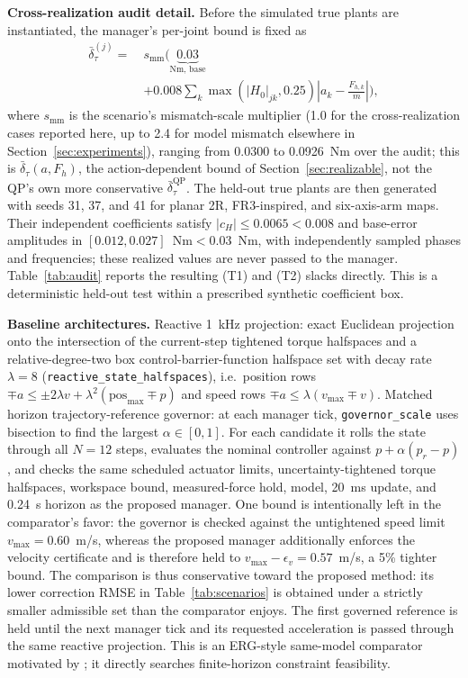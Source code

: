 \documentclass[journal]{IEEEtran}
\begin{document}
\textbf{Cross-realization audit detail.} Before the simulated true plants are instantiated, the manager's per-joint bound is fixed as
\begin{align*}
\bar\delta_\tau^{(j)}
=\ &s_{\mathrm{mm}}\Bigg(\underbrace{0.03}_{\text{Nm, base}} \\
&+0.008\sum_{k}\max\!\left(\left|H_0\right|_{jk},0.25\right)\left|a_k-\frac{F_{h,k}}{m}\right|\Bigg),
\end{align*}
where $s_{\mathrm{mm}}$ is the scenario's mismatch-scale multiplier (1.0 for the cross-realization cases reported here, up to 2.4 for model mismatch elsewhere in Section~\ref{sec:experiments}), ranging from 0.0300 to 0.0926~Nm over the audit; this is $\bar\delta_\tau(a,F_h)$, the action-dependent bound of Section~\ref{sec:realizable}, not the QP's own more conservative $\bar\delta_\tau^{\mathrm{QP}}$. The held-out true plants are then generated with seeds 31, 37, and 41 for planar 2R, FR3-inspired, and six-axis-arm maps. Their independent coefficients satisfy $|c_H|\le0.0065<0.008$ and base-error amplitudes in $[0.012,0.027]$~Nm${}<0.03$~Nm, with independently sampled phases and frequencies; these realized values are never passed to the manager. Table~\ref{tab:audit} reports the resulting (T1) and (T2) slacks directly. This is a deterministic held-out test within a prescribed synthetic coefficient box.

\textbf{Baseline architectures.} Reactive 1~kHz projection: exact Euclidean projection onto the intersection of the current-step tightened torque halfspaces and a relative-degree-two box control-barrier-function halfspace set with decay rate $\lambda=8$ (\texttt{reactive\_state\_halfspaces}), i.e.\ position rows $\mp a\le\pm2\lambda v+\lambda^2(\mathrm{pos}_{\max}\mp p)$ and speed rows $\mp a\le\lambda(v_{\max}\mp v)$. Matched horizon trajectory-reference governor: at each manager tick, \texttt{governor\_scale} uses bisection to find the largest $\alpha\in[0,1]$. For each candidate it rolls the state through all $N=12$ steps, evaluates the nominal controller against $p+\alpha(p_r-p)$, and checks the same scheduled actuator limits, uncertainty-tightened torque halfspaces, workspace bound, measured-force hold, model, 20~ms update, and 0.24~s horizon as the proposed manager. One bound is intentionally left in the comparator's favor: the governor is checked against the untightened speed limit $v_{\max}=0.60$~m/s, whereas the proposed manager additionally enforces the velocity certificate and is therefore held to $v_{\max}-\epsilon_v=0.57$~m/s, a 5\% tighter bound. The comparison is thus conservative toward the proposed method: its lower correction RMSE in Table~\ref{tab:scenarios} is obtained under a strictly smaller admissible set than the comparator enjoys. The first governed reference is held until the next manager tick and its requested acceleration is passed through the same reactive projection. This is an ERG-style same-model comparator motivated by \cite{r17}; it directly searches finite-horizon constraint feasibility.
\end{document}
